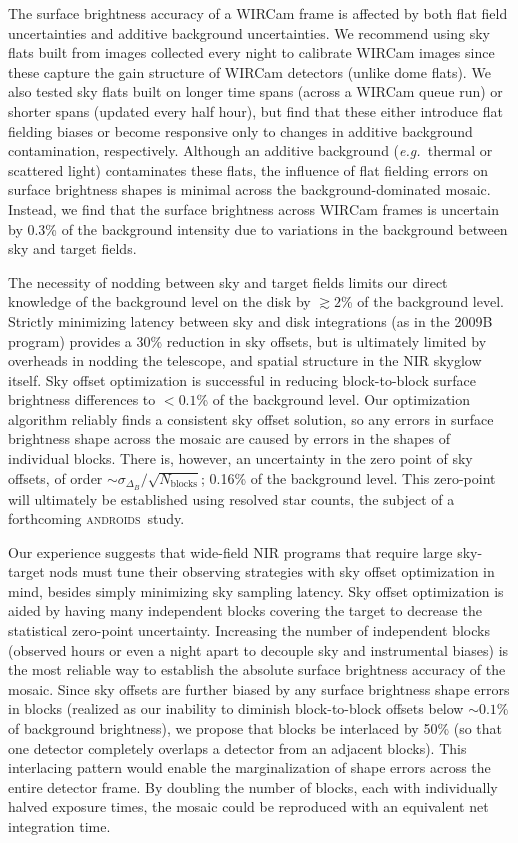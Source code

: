 \documentclass[iop,tighten]{emulateapj}
\newcommand{\eg}{\textit{e.g.~}}
\newcommand{\androids}{\textsc{androids}}
\begin{document}
The surface brightness accuracy of a WIRCam frame is affected by both flat field uncertainties and additive background uncertainties.
We recommend using sky flats built from images collected every night to calibrate WIRCam images since these capture the gain structure of WIRCam detectors (unlike dome flats).
We also tested sky flats built on longer time spans (across a WIRCam queue run) or shorter spans (updated every half hour), but find that these either introduce flat fielding biases or become responsive only to changes in additive background contamination, respectively.
Although an additive background (\eg thermal or scattered light) contaminates these flats, the influence of flat fielding errors on surface brightness shapes is minimal across the background-dominated mosaic.
Instead, we find that the surface brightness across WIRCam frames is uncertain by 0.3\% of the background intensity due to variations in the background between sky and target fields.

The necessity of nodding between sky and target fields limits our direct knowledge of the background level on the disk by $\gtrsim 2$\% of the background level.
Strictly minimizing latency between sky and disk integrations (as in the 2009B program) provides a 30\% reduction in sky offsets, but is ultimately limited by overheads in nodding the telescope, and spatial structure in the NIR skyglow itself.
Sky offset optimization is successful in reducing block-to-block surface brightness differences to $<0.1$\% of the background level.
Our optimization algorithm reliably finds a consistent sky offset solution, so any errors in surface brightness shape across the mosaic are caused by errors in the shapes of individual blocks.
There is, however, an uncertainty in the zero point of sky offsets, of order $\sim \sigma_{\Delta_B} / \sqrt{N_\mathrm{blocks}}$; 0.16\% of the background level.
This zero-point will ultimately be established using resolved star counts, the subject of a forthcoming \androids\ study.

Our experience suggests that wide-field NIR programs that require large sky-target nods must tune their observing strategies with sky offset optimization in mind, besides simply minimizing sky sampling latency.
Sky offset optimization is aided by having many independent blocks covering the target to decrease the statistical zero-point uncertainty.
Increasing the number of independent blocks (observed hours or even a night apart to decouple sky and instrumental biases) is the most reliable way to establish the absolute surface brightness accuracy of the mosaic.
Since sky offsets are further biased by any surface brightness shape errors in blocks (realized as our inability to diminish block-to-block offsets below $\sim 0.1\%$ of background brightness), we propose that blocks be interlaced by 50\% (so that one detector completely overlaps a detector from an adjacent blocks).
This interlacing pattern would enable the marginalization of shape errors across the entire detector frame.
By doubling the number of blocks, each with individually halved exposure times, the mosaic could be reproduced with an equivalent net integration time.
\end{document}
